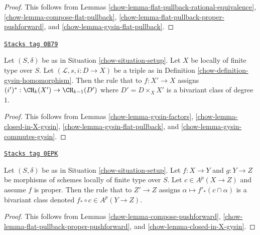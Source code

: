 \begin{proof}

This follows from
Lemmas \ref{chow-lemma-flat-pullback-rational-equivalence},
\ref{chow-lemma-compose-flat-pullback},
\ref{chow-lemma-flat-pullback-proper-pushforward}, and
\ref{chow-lemma-gysin-flat-pullback}.
\end{proof}

\begin{lemma}
\label{chow-lemma-gysin-bivariant}
\href{https://stacks.math.columbia.edu/tag/0B79}{\texttt{Stacks tag 0B79}}

Let $(S, \delta)$ be as in Situation \ref{chow-situation-setup}.
Let $X$ be locally of finite type over $S$.
Let $(\mathcal{L}, s, i : D \to X)$ be a triple as in
Definition \ref{chow-definition-gysin-homomorphism}.
Then the rule that to $f : X' \to X$ assigns
$(i')^* : \CH_k(X') \to \CH_{k - 1}(D')$ where $D' = D \times_X X'$
is a bivariant class of degree $1$.
\end{lemma}

\begin{proof}

This follows from Lemmas \ref{chow-lemma-gysin-factors},
\ref{chow-lemma-closed-in-X-gysin},
\ref{chow-lemma-gysin-flat-pullback}, and
\ref{chow-lemma-gysin-commutes-gysin}.
\end{proof}

\begin{lemma}
\label{chow-lemma-push-proper-bivariant}
\href{https://stacks.math.columbia.edu/tag/0EPK}{\texttt{Stacks tag 0EPK}}

Let $(S, \delta)$ be as in Situation \ref{chow-situation-setup}.
Let $f : X \to Y$ and $g : Y \to Z$ be morphisms of
schemes locally of finite type over $S$.
Let $c \in A^p(X \to Z)$ and assume $f$ is proper.
Then the rule that to $Z' \to Z$ assigns
$\alpha \longmapsto f'_*(c \cap \alpha)$
is a bivariant class denoted $f_* \circ c \in A^p(Y \to Z)$.
\end{lemma}

\begin{proof}

This follows from Lemmas \ref{chow-lemma-compose-pushforward},
\ref{chow-lemma-flat-pullback-proper-pushforward}, and
\ref{chow-lemma-closed-in-X-gysin}.
\end{proof}

